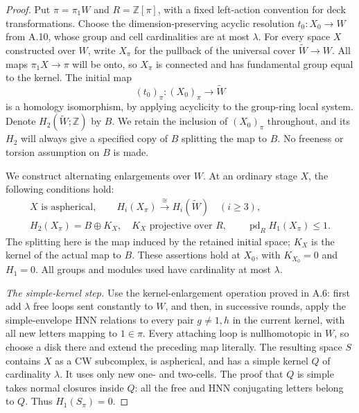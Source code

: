 \begin{proof}
Put $\pi=\pi_1W$ and $R=\mathbb Z[\pi]$, with a fixed left-action
convention for deck transformations. Choose the dimension-preserving
acyclic resolution $t_0:X_0\to W$ from A.10, whose group and cell
cardinalities are at most $\lambda$. For every space $X$ constructed
over $W$, write $X_\pi$ for the pullback of the universal cover
$\widetilde W\to W$. All maps $\pi_1X\to\pi$ will be onto,
so $X_\pi$ is connected and has fundamental group equal to the
kernel. The initial map
\[
 (t_0)_\pi:(X_0)_\pi\longrightarrow\widetilde W
\]
is a homology isomorphism, by applying acyclicity to the group-ring
local system. Denote $H_2(\widetilde W;\mathbb Z)$ by $B$.
We retain the inclusion of $(X_0)_\pi$ throughout, and its
$H_2$ will always give a specified copy of $B$ splitting the
map to $B$. No freeness or torsion assumption on $B$ is made.

We construct alternating enlargements over $W$. At an ordinary
stage $X$, the following conditions hold:
\[
 \begin{gathered}
 X\text{ is aspherical},\qquad
 H_i(X_\pi)\xrightarrow{\cong}H_i(\widetilde W)\quad(i\geq3),\\
 H_2(X_\pi)=B\oplus K_X,\quad K_X\text{ projective over }R,
 \qquad \operatorname{pd}_R H_1(X_\pi)\leq1.
 \tag{A.16.1}
 \end{gathered}
\]
The splitting here is the map induced by the retained initial
space; $K_X$ is the kernel of the actual map to $B$.
These assertions hold at $X_0$, with $K_{X_0}=0$ and $H_1=0$.
All groups and modules used have cardinality at most $\lambda$.

\emph{The simple-kernel step.}
Use the kernel-enlargement operation proved in A.6: first add
$\lambda$ free loops sent constantly to $W$, and then, in
successive rounds, apply the simple-envelope HNN relations to
every pair $g\ne1,h$ in the current kernel, with all new letters
mapping to $1\in\pi$. Every attaching loop is nullhomotopic in
$W$, so choose a disk there and extend the preceding map
literally. The resulting space $S$ contains $X$ as a CW
subcomplex, is aspherical, and has a simple kernel $Q$ of
cardinality $\lambda$. It uses only new one- and two-cells.
The proof that $Q$ is simple takes normal closures inside $Q$:
all the free and HNN conjugating letters belong to $Q$.
Thus $H_1(S_\pi)=0$.


\end{proof}
